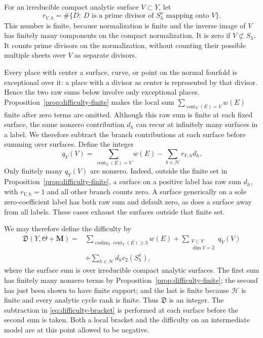 \documentclass[11pt]{amsart}
\theoremstyle{definition}
\theoremstyle{remark}
\numberwithin{equation}{section}
\newcommand{\M}{\mathbf{M}}
\DeclareMathOperator{\cent}{cent}
\DeclareMathOperator{\codim}{codim}
\begin{document}
For an irreducible compact analytic surface \(V\subset Y\), let
\begin{equation}\label{eq:difficulty-branches}
 r_{V,h}=\#\{D:\ D\text{ is a prime divisor of }S_h^\nu
                         \text{ mapping onto }V\}.
\end{equation}
This number is finite, because normalization is finite and the inverse
image of \(V\) has finitely many components on the compact normalization.
It is zero if \(V\not\subset S_h\).  It counts prime divisors on the
normalization, without counting their possible multiple sheets over \(V\)
as separate divisors.

Every place with center a surface, curve, or point on the normal fourfold
is exceptional over it: a place with a divisor as center is represented by
that divisor.  Hence the two raw sums below involve only exceptional
places.  Proposition~\ref{prop:difficulty-finite} makes the local sum
\(\sum_{\cent_Y(E)=V}w(E)\) finite after zero terms are omitted.  Although
this raw sum is finite at each fixed surface, the same nonzero contribution
\(d_h\) can recur at infinitely many surfaces in a label.  We therefore
subtract the branch contributions at each surface before summing over
surfaces.  Define the integer
\begin{equation}\label{eq:difficulty-bracket}
 q_Y(V)=\sum_{\cent_Y(E)=V}w(E)-\sum_{h\in\mathcal H}r_{V,h}d_h.
\end{equation}
Only finitely many \(q_Y(V)\) are nonzero.  Indeed, outside the finite set
in Proposition~\ref{prop:difficulty-finite}, a surface on a positive label
has raw sum \(d_h\), with \(r_{V,h}=1\) and all other branch counts zero.
A surface generically on a sole zero-coefficient label has both raw sum and
default zero, as does a surface away from all labels.  These cases exhaust
the surfaces outside that finite set.

We may therefore define the difficulty by
\begin{equation}\label{eq:difficulty}
 \begin{aligned}
 \mathfrak D(Y,\Theta+\M)
 ={}&\sum_{\codim_Y\cent_Y(E)\geq3}w(E)
   +\sum_{\substack{V\subset Y\\\dim V=2}}q_Y(V)\\
 &+\sum_{h\in\mathcal H}d_hc_2(S_h^\nu),
 \end{aligned}
\end{equation}
where the surface sum is over irreducible compact analytic surfaces.
The first sum has finitely many nonzero terms by
Proposition~\ref{prop:difficulty-finite}; the second has just been shown
to have finite support; and the last is finite because \(\mathcal H\) is
finite and every analytic cycle rank is finite.  Thus \(\mathfrak D\) is
an integer.  The subtraction in \eqref{eq:difficulty-bracket} is performed
at each surface before the second sum is taken.  Both a local bracket and
the difficulty on an intermediate model are at this point allowed to be
negative.
\end{document}

